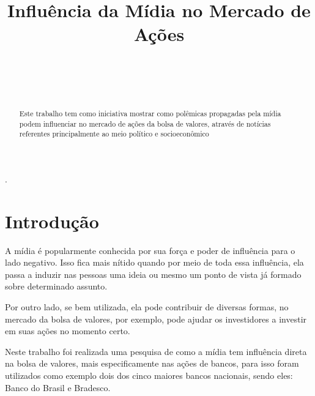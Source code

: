 \documentclass{sigchi}
\def\plaintitle{Influência da Mídia no Mercado de Ações}
\begin{document}
\title{\plaintitle}

\author{%
  \\
  \\
 \\	
}

\maketitle

\begin{abstract}

Este trabalho tem como iniciativa mostrar como polêmicas propagadas pela mídia podem influenciar no mercado de ações da bolsa de valores, através de notícias referentes principalmente ao meio político e socioeconômico\end{abstract}
.


\section{Introdução}
A mídia é popularmente conhecida por sua força e poder de influência para o lado negativo. Isso fica mais nítido quando por meio de toda essa influência, ela passa a induzir nas pessoas uma ideia ou mesmo um ponto de vista já formado sobre determinado assunto. 

Por outro lado, se bem utilizada, ela pode contribuir de diversas formas, no mercado da bolsa de valores, por exemplo, pode ajudar os investidores a investir em suas ações no momento certo.

Neste trabalho foi realizada uma pesquisa de como a mídia tem influência direta na bolsa de valores, mais especificamente nas ações de bancos, para isso foram utilizados como exemplo dois dos cinco maiores bancos nacionais, sendo eles: Banco do Brasil e Bradesco.
\end{document}
